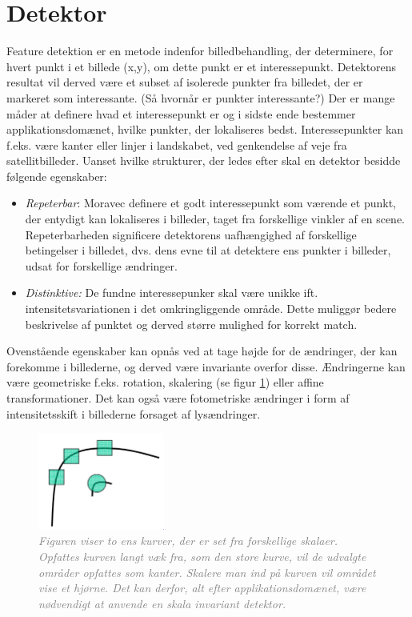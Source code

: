 \section{Detektor}\label{sec:detect}
Feature detektion er en metode indenfor billedbehandling, der determinere, for hvert punkt i et billede (x,y), om dette punkt er et interessepunkt. Detektorens resultat vil derved være et subset af isolerede punkter fra billedet, der er markeret som interessante. (Så hvornår er punkter interessante?) Der er mange måder at definere hvad et interessepunkt er og i sidste ende bestemmer applikationsdomænet, hvilke punkter, der lokaliseres bedst. Interessepunkter kan f.eks. være kanter eller linjer i landskabet, ved genkendelse af veje fra satellitbilleder. Uanset hvilke strukturer, der ledes efter skal en detektor besidde følgende egenskaber:
\begin{itemize}
\item{\emph{Repeterbar}: Moravec \cite{moravec} definere et godt interessepunkt som værende et punkt, der entydigt kan lokaliseres i billeder, taget fra forskellige vinkler af en scene. Repeterbarheden significere detektorens uafhængighed af forskellige betingelser i billedet, dvs. dens evne til at detektere ens punkter i billeder, udsat for forskellige ændringer. }
\item{\emph{Distinktive:}
De fundne interessepunker skal være unikke ift. intensitetsvariationen i det omkringliggende område. Dette muliggør bedere beskrivelse af punktet og derved større mulighed for korrekt match.}
\end{itemize}
Ovenstående egenskaber kan opnås ved at tage højde for de ændringer, der kan forekomme i billederne, og derved være invariante overfor disse. Ændringerne kan være geometriske f.eks. rotation, skalering (se figur \ref{fig:skal}) eller affine transformationer. Det kan også være fotometriske ændringer i form af intensitetsskift i billederne forsaget af lysændringer.
\begin{figure}[H]
    \centering
    \includegraphics[width=0.37\textwidth]{fig/28.png}
     \vspace{-1em}
    \begin{center}    
       \caption{\textcolor{gray}{\footnotesize \textit{Figuren viser to ens kurver, der er set fra forskellige skalaer. Opfattes kurven langt væk fra, som den store kurve, vil de udvalgte områder opfattes som kanter. Skalere man ind på kurven vil området vise et hjørne. Det kan derfor, alt efter applikationsdomænet, være nødvendigt at anvende en skala invariant detektor.}}}
    \label{fig:skal}
     \end{center}
     \vspace{-2.5em}
  \end{figure} \noindent
